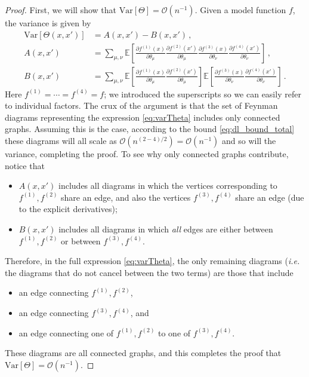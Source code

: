 \documentclass[english]{article}
\newcommand{\dho}{\partial}
\newcommand{\cO}{\ensuremath{\mathcal{O}}}
\newcommand{\lexp}{\mathbb{E}\left[}
\newcommand{\rexp}{\right]}
\begin{document}
\begin{proof}
First, we will show that $\mathrm{Var}[\Theta] = \cO(n^{-1})$.
Given a model function $f$, the variance is given by
\begin{align}
  \mathrm{Var}[\Theta(x,x')] &= A(x,x') - B(x,x') \,,
  \label{eq:varTheta} \\
  A(x,x') &= 
  \sum_{\mu,\nu}
  \lexp
  \frac{\dho f^{(1)}(x)}{\dho \theta_\mu} \frac{\dho f^{(2)}(x')}{\dho \theta_\mu}
  \frac{\dho f^{(3)}(x)}{\dho \theta_\nu} \frac{\dho f^{(4)}(x')}{\dho \theta_\nu}
  \rexp \,,
  \label{eq:varTheta_A} \\
  B(x,x') &= 
  \sum_{\mu,\nu}
  \lexp \frac{\dho f^{(1)}(x)}{\dho \theta_\mu} \frac{\dho f^{(2)}(x')}{\dho \theta_\mu} \rexp 
  \lexp \frac{\dho f^{(3)}(x)}{\dho \theta_\nu} \frac{\dho f^{(4)}(x')}{\dho \theta_\nu} \rexp  \,.
  \label{eq:varTheta_B}
\end{align}
Here $f^{(1)} = \cdots = f^{(4)} = f$; we introduced the superscripts so we can easily refer to individual factors.
The crux of the argument is that the set of Feynman diagrams representing the expression \eqref{eq:varTheta} includes only connected graphs.
Assuming this is the case, according to the bound \eqref{eq:dl_bound_total} these diagrams will all scale as $\cO(n^{(2-4)/2}) = \cO(n^{-1})$ and so will the variance, completing the proof.
To see why only connected graphs contribute, notice that 
\begin{itemize}
\item $A(x,x')$ includes all diagrams in which the vertices corresponding to $f^{(1)},f^{(2)}$ share an edge, and also the vertices $f^{(3)},f^{(4)}$ share an edge (due to the explicit derivatives); 
\item $B(x,x')$ includes all diagrams in which \textit{all} edges are either between
  $f^{(1)},f^{(2)}$ or between $f^{(3)},f^{(4)}$.
\end{itemize}
Therefore, in the full expression \eqref{eq:varTheta}, the only remaining diagrams (\textit{i.e.} the diagrams that do not cancel between the two terms) are those that include
\begin{itemize}
\item an edge connecting $f^{(1)},f^{(2)}$,
\item an edge connecting $f^{(3)},f^{(4)}$, and
\item an edge connecting one of $f^{(1)},f^{(2)}$ to one of $f^{(3)},f^{(4)}$.
\end{itemize}
These diagrams are all connected graphs, and this completes the proof that $\mathrm{Var}[\Theta] = \cO(n^{-1})$.


\end{proof}
\end{document}
